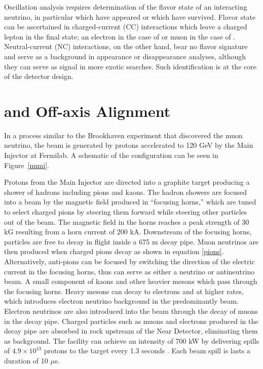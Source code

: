 Oscillation analysis requires determination of the flavor state of an
interacting neutrino, in particular \nue which
have appeared or \numu which have survived.
Flavor state can be ascertained in charged-current (CC) interactions
which leave a charged lepton in the final state; an electron in the case
of \nue or muon in the case of \numu.
Neutral-current (NC) interactions, on the other hand, bear no flavor signature
and serve as a background in \nue appearance or \numu disappearance analyses,
although they can serve as signal in more exotic searches.
Such identification is at the core of the \nova detector design.


\section{\numi and  Off-axis Alignment }\label{sec:numi}

In a process similar to the Brookhaven experiment that discovered the muon neutrino, the \numi beam is generated by protons accelerated to 120 GeV by the Main Injector at Fermilab.  A schematic of the \numi configuration can be seen in Figure~\ref{numi}.

Protons from the Main Injector are directed into a graphite target producing a shower of hadrons including pions and kaons.  The hadron showers are focused into a beam by the magnetic field produced in ``focusing horns,'' which are tuned to select charged pions by steering them forward while steering other particles out of the beam.
The magnetic field in the horns reaches a peak strength of 30 kG resulting from
a horn current of 200 kA.
Downstream of the focusing horns, particles are free to decay in flight inside a 675 m decay pipe.  Muon neutrinos are then produced when charged pions decay as shown in equation \eqref{pions}.  Alternatively, anti-pions can be focused by switching the direction of the electric current in the focusing horns, thus \numi can serve as either a neutrino or antineutrino beam.  A small component of kaons and other heavier mesons which pass through the focusing horns.  Heavy mesons can decay to electrons and \nue at higher rates, which introduces electron neutrino background in the predominantly \numu beam.
Electron neutrinos are also introduced into the beam through the decay of
muons in the decay pipe.
Charged particles such as muons and electrons produced in the decay pipe are absorbed in rock upstream of the \nova Near Detector, eliminating them as background.
The \numi facility can achieve an intensity of 700 kW by delivering spills of
$4.9 \times 10^{13}$ protons to the target every 1.3 seconds \cite{tdr}.
Each beam spill is lasts a duration of 10 $\mu$s.


